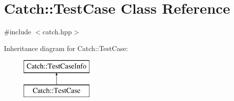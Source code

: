 \hypertarget{class_catch_1_1_test_case}{}\section{Catch\+:\+:Test\+Case Class Reference}
\label{class_catch_1_1_test_case}


{\ttfamily \#include $<$catch.\+hpp$>$}

Inheritance diagram for Catch\+:\+:Test\+Case\+:\begin{figure}[H]
\begin{center}
\leavevmode
\includegraphics[height=2.000000cm]{class_catch_1_1_test_case}
\end{center}
\end{figure}
